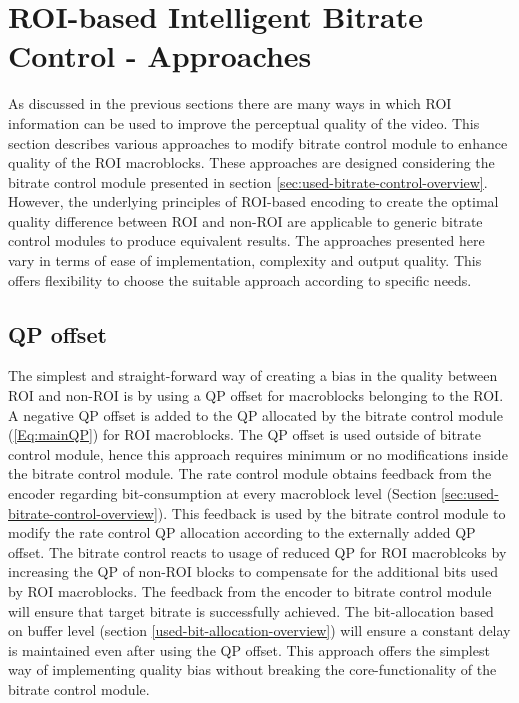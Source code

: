 \documentclass[11pt]{article} %
\begin{document}
\section{ROI-based Intelligent Bitrate Control - Approaches}
As discussed in the previous sections there are many ways in which ROI information can be used to improve the perceptual quality of the video. This section describes various approaches to modify bitrate control module to enhance quality of the ROI macroblocks. These approaches are designed considering the bitrate control module presented in section \ref{sec:used-bitrate-control-overview}. However, the underlying principles of ROI-based encoding to create the optimal quality difference between ROI and non-ROI are applicable to generic bitrate control modules to produce equivalent results. The approaches presented here vary in terms of ease of implementation, complexity and output quality. This offers flexibility to choose the suitable approach according to specific needs.

\subsection{QP offset}
The simplest and straight-forward way of creating a bias in the quality between ROI and non-ROI is by using a QP offset for macroblocks belonging to the ROI. A negative QP offset is added to the QP allocated by the bitrate control module (\ref{Eq:mainQP}) for ROI macroblocks. The QP offset is used outside of bitrate control module, hence this approach requires minimum or no modifications inside the bitrate control module. The rate control module obtains feedback from the encoder regarding bit-consumption at every macroblock level (Section \ref{sec:used-bitrate-control-overview}). This feedback is used by the bitrate control module to modify the rate control QP allocation according to the externally added QP offset. The bitrate control reacts to usage of reduced QP for ROI macroblcoks by increasing the QP of non-ROI blocks to compensate for the additional bits used by ROI macroblocks. The feedback from the encoder to bitrate control module will ensure that target bitrate is successfully achieved. The bit-allocation based on buffer level (section \ref{used-bit-allocation-overview}) will ensure a constant delay is maintained even after using the QP offset. This approach offers the simplest way of implementing quality bias without breaking the core-functionality of the bitrate control module.  
\end{document}
